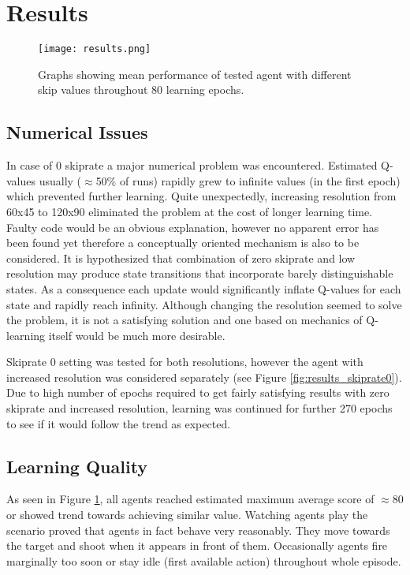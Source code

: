 \section{Results}
		\begin{figure}
			\centering
			\texttt{[image: results.png]}
			\caption{Graphs showing mean performance of tested agent with different skip values throughout 80 learning epochs.}\label{fig:results}
		\end{figure}
	\subsection{Numerical Issues}
		In case of 0 skiprate a major numerical problem was encountered. Estimated Q-values usually ($\approx$50\% of runs) rapidly grew to infinite values (in the first epoch) which prevented further learning. Quite unexpectedly, increasing resolution from 60x45 to 120x90 eliminated the problem at the cost of longer learning time. Faulty code would be an obvious explanation, however no apparent error has been found yet therefore a conceptually oriented mechanism is also to be considered. It is hypothesized that combination of zero skiprate and low resolution may produce state transitions that incorporate barely distinguishable states. As a consequence each update would significantly inflate Q-values for each state and rapidly reach infinity. Although changing the resolution seemed to solve the problem, it is not a satisfying solution and one based on mechanics of Q-learning itself would be much more desirable.

		Skiprate 0 setting was tested for both resolutions, however the agent with increased resolution was considered separately (see Figure \ref{fig:results_skiprate0}). Due to high number of epochs required to get fairly satisfying results with zero skiprate and increased resolution, learning was continued for further 270 epochs to see if it would follow the trend as expected.

	\subsection{Learning Quality}
		As seen in Figure \ref{fig:results}, all agents reached estimated maximum average score of $\approx$80 or showed trend towards achieving similar value. Watching agents play the scenario proved that agents in fact behave very reasonably. They move towards the target and shoot when it appears in front of them. Occasionally agents fire marginally too soon or stay idle (first available action) throughout whole episode. 
		

